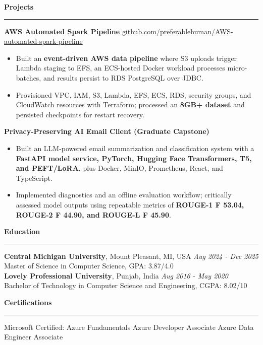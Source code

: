 \documentclass[11pt,letterpaper]{article}
\newcommand{\ressection}[1]{\Needspace{6\baselineskip}\vspace{8pt}\par\textbf{#1}\par\vspace{2pt}\hrule\vspace{5pt}}
\begin{document}
\ressection{Projects}
\textbf{AWS Automated Spark Pipeline} \hfill \href{https://github.com/preferablehuman/AWS-automated-spark-pipeline}{github.com/preferablehuman/AWS-automated-spark-pipeline}
\begin{itemize}
  \item Built an \textbf{event-driven AWS data pipeline} where S3 uploads trigger Lambda staging to EFS, an ECS-hosted Docker workload processes micro-batches, and results persist to RDS PostgreSQL over JDBC.
  \item Provisioned VPC, IAM, S3, Lambda, EFS, ECS, RDS, security groups, and CloudWatch resources with Terraform; processed an \textbf{8GB+ dataset} and persisted checkpoints for restart recovery.
\end{itemize}
\vspace{2pt}
\textbf{Privacy-Preserving AI Email Client (Graduate Capstone)}
\begin{itemize}
  \item Built an LLM-powered email summarization and classification system with a \textbf{FastAPI model service, PyTorch, Hugging Face Transformers, T5, and PEFT/LoRA}, plus Docker, MinIO, Prometheus, React, and TypeScript.
  \item Implemented diagnostics and an offline evaluation workflow; critically assessed model outputs using repeatable metrics of \textbf{ROUGE-1 F 53.04, ROUGE-2 F 44.90, and ROUGE-L F 45.90}.
\end{itemize}
\ressection{Education}
\textbf{Central Michigan University}, Mount Pleasant, MI, USA \hfill \textit{Aug 2024 - Dec 2025}\\
Master of Science in Computer Science, GPA: 3.87/4.0\\
\textbf{Lovely Professional University}, Punjab, India \hfill \textit{Aug 2016 - May 2020}\\
Bachelor of Technology in Computer Science and Engineering, CGPA: 8.02/10

\ressection{Certifications}
Microsoft Certified: Azure Fundamentals \textbar{} Azure Developer Associate \textbar{} Azure Data Engineer Associate
\end{document}
